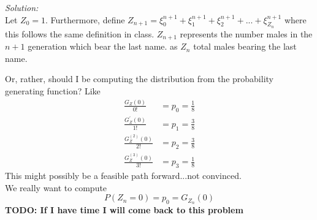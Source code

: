 \documentclass[10pt]{amsart}
\begin{document}
\noindent
\textit{Solution:} \\
Let $Z_0 = 1$.
Furthermore, define $Z_{n+1} = \xi_0^{n + 1} + \xi_1^{n + 1} + \xi_2^{n + 1} + ... + \xi_{Z_n}^{n + 1}$ where this follows the same definition in class.
$Z_{n+1}$ represents the number males in the $n+1$ generation which bear the last name.
as $Z_n$ total males bearing the last name.

Or, rather, should I be computing the distribution from the probability generating function? Like
\begin{align*}
\frac{G_Z(0)}{0!} &= p_0 = \frac 1 8\\
\frac{G_Z^\prime(0)}{1!} &= p_1 = \frac 3 8 \\
\frac{G_Z^{(2)}(0)}{2!} &= p_2 = \frac 3 8 \\
\frac{G_Z^{(3)}(0)}{3!} &= p_3 = \frac 1 8
\end{align*}
This might possibly be a feasible path forward...not convinced. \\

\noindent
We really want to compute
$$
P(Z_n = 0) = p_0 = G_{Z_n}(0)
$$
\textbf{TODO: If I have time I will come back to this problem}

\newpage
\end{document}
